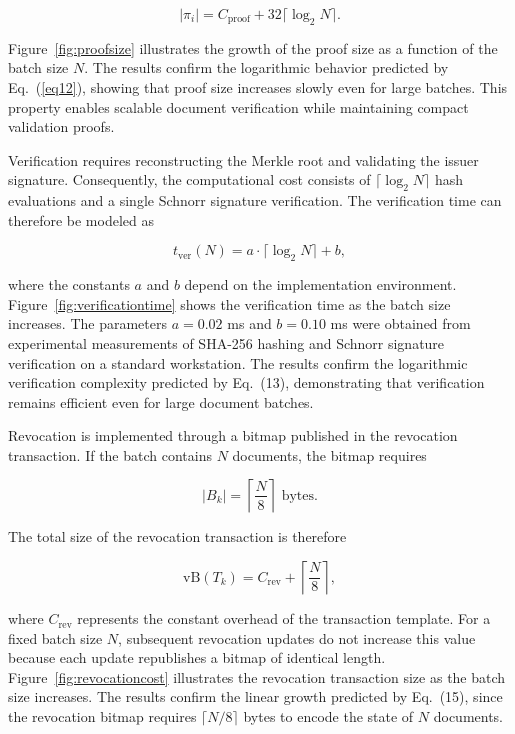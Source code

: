 \documentclass[preprint,12pt]{elsarticle}
\begin{document}
\begin{equation}
|\pi_i| = C_{\mathrm{proof}} + 32\lceil\log_2 N\rceil.
\label{eq12}
\end{equation}

Figure~\ref{fig:proofsize} illustrates the growth of the proof size as a function of the batch size $N$.  The results confirm the logarithmic behavior predicted by Eq.~(\ref{eq12}), showing that proof size increases slowly even for large batches.  This property enables scalable document verification while maintaining compact validation proofs.


Verification requires reconstructing the Merkle root and validating the issuer signature. 
Consequently, the computational cost consists of $\lceil\log_2 N\rceil$ hash evaluations and a single Schnorr signature verification. 
The verification time can therefore be modeled as

\begin{equation}
t_{\mathrm{ver}}(N) = a \cdot \lceil\log_2 N\rceil + b,
\end{equation}

where the constants $a$ and $b$ depend on the implementation environment. Figure~\ref{fig:verificationtime} shows the verification time as the batch size increases. 
The parameters $a = 0.02$ ms and $b = 0.10$ ms were obtained from experimental measurements of SHA-256 hashing and Schnorr signature verification on a standard workstation. The results confirm the logarithmic verification complexity predicted by Eq.~(13), demonstrating that verification remains efficient even for large document batches.

Revocation is implemented through a bitmap published in the revocation transaction. 
If the batch contains $N$ documents, the bitmap requires

\begin{equation}
|B_k| = \left\lceil \frac{N}{8} \right\rceil \text{ bytes}.
\end{equation}

The total size of the revocation transaction is therefore

\begin{equation}
\mathrm{vB}(T_k) = C_{\mathrm{rev}} + \left\lceil \frac{N}{8} \right\rceil,
\end{equation}

where $C_{\mathrm{rev}}$ represents the constant overhead of the transaction template. For a fixed batch size $N$, subsequent revocation updates do not increase this value because each update republishes a bitmap of identical length. Figure~\ref{fig:revocationcost} illustrates the revocation transaction size as the batch size increases. 
The results confirm the linear growth predicted by Eq.~(15), since the revocation bitmap requires $\lceil N/8 \rceil$ bytes to encode the state of $N$ documents.
\end{document}
